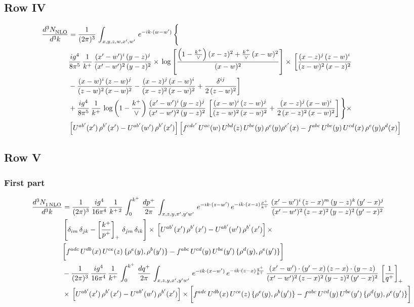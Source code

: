\documentclass[9pt]{article}
\numberwithin{equation}{section}
\begin{document}
\subsection{Row IV}
\begin{align}
    \frac{d^{3}N_{\rm NLO}^{\rm}}{d^{3}k}  & =   \frac{1}{(2\pi)^{3}}\,
    \int_{x,y,z,w,x',w'}\,e^{-ik\cdot (w-w^\prime)}\,\Bigg\{\notag \\
& \frac{ig^{4}}{8\pi^{5}}\,\frac{1}{k^{+}}\,\frac{(x'-w')^{i}\,(y-z)^{j}}{(x'-w')^{2}\,(y-z)^{2}}\times\,\log{\left[\frac{\left(1-\frac{k^{+}}{\vee}\right)(x-z)^{2}+\frac{k^{+}}{\vee}\,(x-w)^{2}}{(x-w)^{2}}\right]}\times\, \bigg[\frac{(x-z)^{j}\,(z-w)^{i}}{(z-w)^{2}\,(x-z)^{2}}\notag \\ & -\frac{(x-w)^{i}\,(z-w)^{j}}{(z-w)^{2}\,(x-w)^{2}}-\frac{(x-z)^{j}\,(x-w)^{i}}{(x-z)^{2}\,(x-w)^{2}}+\frac{\delta^{ij}}{2\,(z-w)^{2}}\bigg] \notag \\
& + \frac{ig^{4}}{8\pi^{5}}\,\frac{1}{k^{+}}\,\log{\left(1-\frac{k^{+}}{\vee}\right)}\,\frac{(x'-w')^{i}\,(y-z)^{j}}{(x'-w')^{2}\,(y-z)^{2}}\,\left[\frac{(x-w)^{i}\,(z-w)^{j}}{(z-w)^{2}\,(x-w)^{2}}+\frac{(x-z)^{j}\,(x-w)^{i}}{2\, (x-z)^{2}\,(x-w)^{2}}\right]\Bigg\}\times\notag \\ &  \left[U^{ab'}(x')\,\rho^{b'}(x')-U^{ab'}(w')\,\rho^{b'}(x')\right] \left[f^{cdc'}\,U^{ac}(w)\,U^{bd}(z)\,U^{be}(y)\,\rho^{e}(y)\rho^{c'}(x)-f^{abc}\,U^{be}(y)\,U^{cd}(x)\,\rho^{e}(y)\rho^{d}(x)\right]
\end{align}
\subsection{Row V}
\subsubsection*{First part}
\begin{align}
     \frac{d^{3}N_{1\,\rm NLO}^{\rm}}{d^{3}k}  & =  \frac{1}{(2\pi)^{3}}\, \frac{ig^{4}}{16\pi^{4}}\, \frac{1}{k^{+\,2}}\,\int_{0}^{k^{+}}\, \frac{dp^{+}}{2\pi}\,\int_{x,z,y,x',y'w'}\,e^{-ik\cdot (z-w^\prime)}\,e^{-ik\cdot (x-z)\frac{p^{+}}{k^{+}}}\,\frac{(x'-w')^{i}\,(z-x)^{m}\,(y-z)^{k}\,(y'-x)^{j}}{(x'-w')^{2}\,(z-x)^{2}\,(y-z)^{2}\,(y'-x)^{2}}\,\notag \\ & \left[\delta_{im}\,\delta_{jk}-\left[\frac{k^{+}}{p^{+}}\right]_{+}\, \delta_{jm}\,\delta_{ik}\right]\times\, \left[U^{ab'}(x')\,\rho^{b'}(x')-U^{ab'}(w')\,\rho^{b'}(x')\right]\times\notag \\ & \bigg[f^{adc}\,U^{db}(x)\,U^{ce}(z)\, \{\rho^{e}(y),\rho^{b}(y')\}-f^{abc}\,U^{cd}(y)\,U^{be}(y')\, \{\rho^{d}(y),\rho^{e}(y')\}\bigg] \notag \\ & -\frac{1}{(2\pi)^{3}}\, \frac{ig^{4}}{16\pi^{4}}\, \frac{1}{k^{+}}\,\int_{0}^{k^{+}}\, \frac{dq^{+}}{2\pi}\,\int_{x,z,y,x',y'w'}\,e^{-ik\cdot (x-w^\prime)}\,e^{-ik\cdot (z-x)\frac{q^{+}}{k^{+}}}\,\frac{(x'-w')\cdot (y'-x)\,(z-x)\cdot (y-z)}{(x'-w')^{2}\,(z-x)^{2}\,(y-z)^{2}\,(y'-x)^{2}}\,\left[\frac{1}{q^{+}}\right]_{+}\notag \\ & \times\, \left[U^{ab'}(x')\,\rho^{b'}(x')-U^{ab'}(w')\,\rho^{b'}(x')\right]\times \bigg[f^{adc}\,U^{db}(x)\,U^{ce}(z)\, \{\rho^{e}(y),\rho^{b}(y')\}-f^{abc}\,U^{cd}(y)\,U^{be}(y')\, \{\rho^{d}(y),\rho^{e}(y')\}\bigg]
\end{align}
\end{document}
